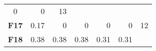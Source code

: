 \documentclass[12pt,a4paper]{article}
\begin{document}
\begin{longtable}[c]{@{}crrrrrr@{}}
\begin{minipage}[t]{0.10\columnwidth}
0
\strut\end{minipage} &
\begin{minipage}[t]{0.11\columnwidth}\raggedleft\strut
0
\strut\end{minipage} &
\begin{minipage}[t]{0.07\columnwidth}\raggedleft\strut
13
\strut\end{minipage}\tabularnewline
\begin{minipage}[t]{0.11\columnwidth}\centering\strut
\textbf{F17}
\strut\end{minipage} &
\begin{minipage}[t]{0.07\columnwidth}\raggedleft\strut
0.17
\strut\end{minipage} &
\begin{minipage}[t]{0.08\columnwidth}\raggedleft\strut
0
\strut\end{minipage} &
\begin{minipage}[t]{0.09\columnwidth}\raggedleft\strut
0
\strut\end{minipage} &
\begin{minipage}[t]{0.10\columnwidth}\raggedleft\strut
0
\strut\end{minipage} &
\begin{minipage}[t]{0.11\columnwidth}\raggedleft\strut
0
\strut\end{minipage} &
\begin{minipage}[t]{0.07\columnwidth}\raggedleft\strut
12
\strut\end{minipage}\tabularnewline
\begin{minipage}[t]{0.11\columnwidth}\centering\strut
\textbf{F18}
\strut\end{minipage} &
\begin{minipage}[t]{0.07\columnwidth}\raggedleft\strut
0.38
\strut\end{minipage} &
\begin{minipage}[t]{0.08\columnwidth}\raggedleft\strut
0.38
\strut\end{minipage} &
\begin{minipage}[t]{0.09\columnwidth}\raggedleft\strut
0.38
\strut\end{minipage} &
\begin{minipage}[t]{0.10\columnwidth}\raggedleft\strut
0.31
\strut\end{minipage} &
\begin{minipage}[t]{0.11\columnwidth}\raggedleft\strut
0.31
\strut\end{minipage} &
\begin{minipage}[t]{0.07\columnwidth}\raggedleft\strut

\end{minipage}
\end{longtable}
\end{document}

